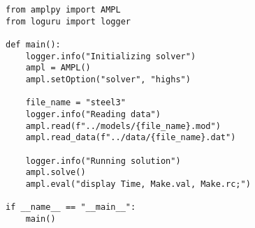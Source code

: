 \begin{verbatim}
from amplpy import AMPL
from loguru import logger

def main():
    logger.info("Initializing solver")
    ampl = AMPL()
    ampl.setOption("solver", "highs")

    file_name = "steel3"
    logger.info("Reading data")
    ampl.read(f"../models/{file_name}.mod")
    ampl.read_data(f"../data/{file_name}.dat")

    logger.info("Running solution")
    ampl.solve()
    ampl.eval("display Time, Make.val, Make.rc;")

if __name__ == "__main__":
    main()
\end{verbatim}